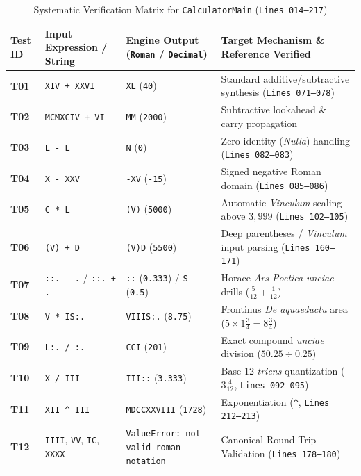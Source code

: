 \documentclass[10pt, a4paper]{article}
\begin{document}
\begin{table}[h!]
\centering
\caption{Systematic Verification Matrix for \texttt{CalculatorMain} (\texttt{Lines 014--217})}
\label{tab:fullmatrix}
\footnotesize
\begin{tabular}{@{}llll@{}}
\toprule
\textbf{Test ID} & \textbf{Input Expression / String} & \textbf{Engine Output (\texttt{Roman} / \texttt{Decimal})} & \textbf{Target Mechanism \& Reference Verified} \\ \midrule
\textbf{T01} & \texttt{XIV + XXVI} & \texttt{XL} (\texttt{40}) & Standard additive/subtractive synthesis (\texttt{Lines 071--078}) \cite{steins2022, lewis2019} \\
\textbf{T02} & \texttt{MCMXCIV + VI} & \texttt{MM} (\texttt{2000}) & Subtractive lookahead \& carry propagation \cite{geeksforgeeks2021, steins2022} \\
\textbf{T03} & \texttt{L - L} & \texttt{N} (\texttt{0}) & Zero identity (\textit{Nulla}) handling (\texttt{Lines 082--083}) \\
\textbf{T04} & \texttt{X - XXV} & \texttt{-XV} (\texttt{-15}) & Signed negative Roman domain (\texttt{Lines 085--086}) \\
\textbf{T05} & \texttt{C * L} & \texttt{(V)} (\texttt{5000}) & Automatic \textit{Vinculum} scaling above $3,999$ (\texttt{Lines 102--105}) \cite{lewis2019} \\
\textbf{T06} & \texttt{(V) + D} & \texttt{(V)D} (\texttt{5500}) & Deep parentheses / \textit{Vinculum} input parsing (\texttt{Lines 160--171}) \cite{lewis2019} \\
\textbf{T07} & \texttt{::. - .} / \texttt{::. + .} & \texttt{::} (\texttt{0.333}) / \texttt{S} (\texttt{0.5}) & Horace \textit{Ars Poetica} \textit{unciae} drills ($\frac{5}{12} \mp \frac{1}{12}$) \cite{maher2001} \\
\textbf{T08} & \texttt{V * IS:.} & \texttt{VIIIS:.} (\texttt{8.75}) & Frontinus \textit{De aquaeductu} area ($5 \times 1\frac{3}{4} = 8\frac{3}{4}$) \cite{maher2001} \\
\textbf{T09} & \texttt{L:. / :.} & \texttt{CCI} (\texttt{201}) & Exact compound \textit{unciae} division ($50.25 \div 0.25$) \cite{maher2001} \\
\textbf{T10} & \texttt{X / III} & \texttt{III::} (\texttt{3.333}) & Base-12 \textit{triens} quantization ($3\frac{4}{12}$, \texttt{Lines 092--095}) \cite{maher2001} \\
\textbf{T11} & \texttt{XII \^{} III} & \texttt{MDCCXXVIII} (\texttt{1728}) & Exponentiation (\texttt{\^{}}, \texttt{Lines 212--213}) \\
\textbf{T12} & \texttt{IIII}, \texttt{VV}, \texttt{IC}, \texttt{XXXX} & \texttt{ValueError: not valid roman notation} & Canonical Round-Trip Validation (\texttt{Lines 178--180}) \cite{lewis2019} \\ \bottomrule
\end{tabular}
\end{table}
\end{document}
